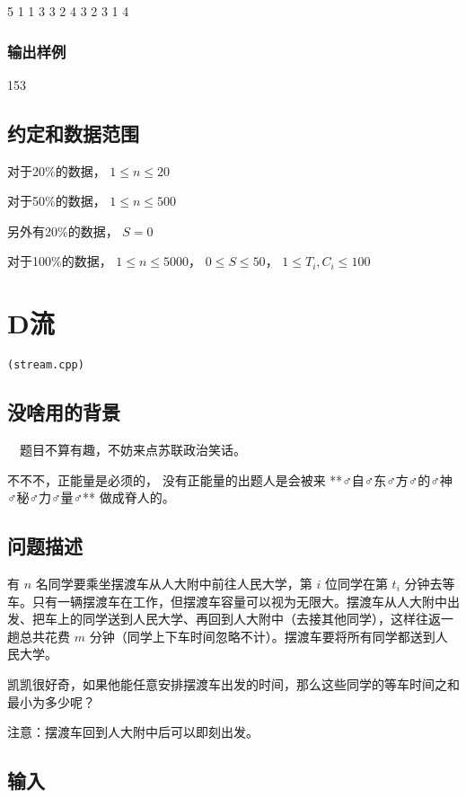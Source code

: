 \documentclass[UTF8]{ctexart}
\begin{document}
5
1
1 3
3 2
4 3
2 3
1 4

\subsubsection{输出样例}

153


\subsection{约定和数据范围}

对于20\%的数据， $1\le n\le 20$

对于50\%的数据， $1\le n\le 500$

另外有20\%的数据， $S=0$

对于100\%的数据， $1\le n\le 5000$， $0\le S\le 50$， $1\le T_i,C_i\le 100$

\newpage
\section{D流}
\begin{center}
\tt\large{(stream.cpp)}
\end{center}

\subsection{没啥用的背景}

~~题目不算有趣，不妨来点苏联政治笑话。~~

不不不，正能量是必须的， 没有正能量的出题人是会被来 **♂自♂东♂方♂的♂神♂秘♂力♂量♂** 做成脊人的。



\subsection{问题描述}

有 $n$ 名同学要乘坐摆渡车从人大附中前往人民大学，第 $i$ 位同学在第 $t_i$ 分钟去等车。只有一辆摆渡车在工作，但摆渡车容量可以视为无限大。摆渡车从人大附中出发、把车上的同学送到人民大学、再回到人大附中（去接其他同学），这样往返一趟总共花费 $m$ 分钟（同学上下车时间忽略不计）。摆渡车要将所有同学都送到人民大学。

凯凯很好奇，如果他能任意安排摆渡车出发的时间，那么这些同学的等车时间之和最小为多少呢？

注意：摆渡车回到人大附中后可以即刻出发。

\subsection{输入}
\end{document}
